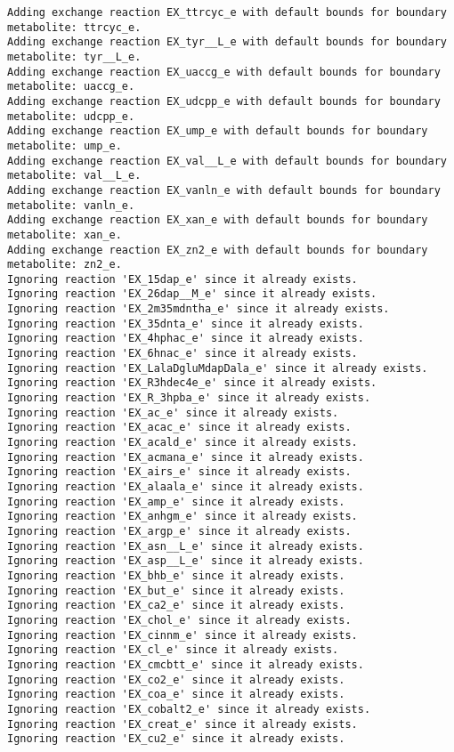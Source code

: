 \documentclass[
  letterpaper,
  DIV=11,
  numbers=noendperiod]{scrartcl}
\begin{document}
\begin{verbatim}
Adding exchange reaction EX_ttrcyc_e with default bounds for boundary metabolite: ttrcyc_e.
Adding exchange reaction EX_tyr__L_e with default bounds for boundary metabolite: tyr__L_e.
Adding exchange reaction EX_uaccg_e with default bounds for boundary metabolite: uaccg_e.
Adding exchange reaction EX_udcpp_e with default bounds for boundary metabolite: udcpp_e.
Adding exchange reaction EX_ump_e with default bounds for boundary metabolite: ump_e.
Adding exchange reaction EX_val__L_e with default bounds for boundary metabolite: val__L_e.
Adding exchange reaction EX_vanln_e with default bounds for boundary metabolite: vanln_e.
Adding exchange reaction EX_xan_e with default bounds for boundary metabolite: xan_e.
Adding exchange reaction EX_zn2_e with default bounds for boundary metabolite: zn2_e.
Ignoring reaction 'EX_15dap_e' since it already exists.
Ignoring reaction 'EX_26dap__M_e' since it already exists.
Ignoring reaction 'EX_2m35mdntha_e' since it already exists.
Ignoring reaction 'EX_35dnta_e' since it already exists.
Ignoring reaction 'EX_4hphac_e' since it already exists.
Ignoring reaction 'EX_6hnac_e' since it already exists.
Ignoring reaction 'EX_LalaDgluMdapDala_e' since it already exists.
Ignoring reaction 'EX_R3hdec4e_e' since it already exists.
Ignoring reaction 'EX_R_3hpba_e' since it already exists.
Ignoring reaction 'EX_ac_e' since it already exists.
Ignoring reaction 'EX_acac_e' since it already exists.
Ignoring reaction 'EX_acald_e' since it already exists.
Ignoring reaction 'EX_acmana_e' since it already exists.
Ignoring reaction 'EX_airs_e' since it already exists.
Ignoring reaction 'EX_alaala_e' since it already exists.
Ignoring reaction 'EX_amp_e' since it already exists.
Ignoring reaction 'EX_anhgm_e' since it already exists.
Ignoring reaction 'EX_argp_e' since it already exists.
Ignoring reaction 'EX_asn__L_e' since it already exists.
Ignoring reaction 'EX_asp__L_e' since it already exists.
Ignoring reaction 'EX_bhb_e' since it already exists.
Ignoring reaction 'EX_but_e' since it already exists.
Ignoring reaction 'EX_ca2_e' since it already exists.
Ignoring reaction 'EX_chol_e' since it already exists.
Ignoring reaction 'EX_cinnm_e' since it already exists.
Ignoring reaction 'EX_cl_e' since it already exists.
Ignoring reaction 'EX_cmcbtt_e' since it already exists.
Ignoring reaction 'EX_co2_e' since it already exists.
Ignoring reaction 'EX_coa_e' since it already exists.
Ignoring reaction 'EX_cobalt2_e' since it already exists.
Ignoring reaction 'EX_creat_e' since it already exists.
Ignoring reaction 'EX_cu2_e' since it already exists.

\end{verbatim}
\end{document}
